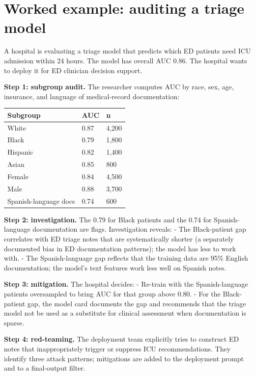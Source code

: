 \documentclass[
  letterpaper,
  11pt]{scrbook}
\newcounter{none} %
\begin{document}
\section{Worked example: auditing a triage
model}\label{worked-example-auditing-a-triage-model}

A hospital is evaluating a triage model that predicts which ED patients
need ICU admission within 24 hours. The model has overall AUC 0.86. The
hospital wants to deploy it for ED clinician decision support.

\textbf{Step 1: subgroup audit.} The researcher computes AUC by race,
sex, age, insurance, and language of medical-record documentation:

{\def\LTcaptype{none} %
\begin{longtable}[]{@{}lll@{}}
\toprule\noalign{}
Subgroup & AUC & n \\
\midrule\noalign{}
\endhead
\bottomrule\noalign{}
\endlastfoot
White & 0.87 & 4,200 \\
Black & 0.79 & 1,800 \\
Hispanic & 0.82 & 1,400 \\
Asian & 0.85 & 800 \\
Female & 0.84 & 4,500 \\
Male & 0.88 & 3,700 \\
Spanish-language docs & 0.74 & 600 \\
\end{longtable}
}

\textbf{Step 2: investigation.} The 0.79 for Black patients and the 0.74
for Spanish-language documentation are flags. Investigation reveals: -
The Black-patient gap correlates with ED triage notes that are
systematically shorter (a separately documented bias in ED documentation
patterns); the model has less to work with. - The Spanish-language gap
reflects that the training data are 95\% English documentation; the
model's text features work less well on Spanish notes.

\textbf{Step 3: mitigation.} The hospital decides: - Re-train with the
Spanish-language patients oversampled to bring AUC for that group above
0.80. - For the Black-patient gap, the model card documents the gap and
recommends that the triage model not be used as a substitute for
clinical assessment when documentation is sparse.

\textbf{Step 4: red-teaming.} The deployment team explicitly tries to
construct ED notes that inappropriately trigger or suppress ICU
recommendations. They identify three attack patterns; mitigations are
added to the deployment prompt and to a final-output filter.
\end{document}
